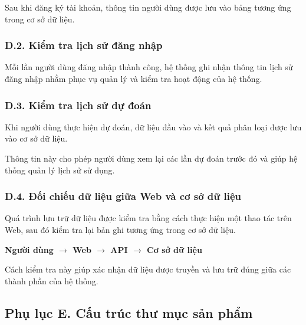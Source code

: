 \documentclass[14pt]{extarticle}
\begin{document}
	\noindent
	Sau khi đăng ký tài khoản, thông tin người dùng được lưu vào bảng
	tương ứng trong cơ sở dữ liệu.
	
	
	\subsubsection*{D.2. Kiểm tra lịch sử đăng nhập}
	
	\noindent
	Mỗi lần người dùng đăng nhập thành công, hệ thống ghi nhận thông tin
	lịch sử đăng nhập nhằm phục vụ quản lý và kiểm tra hoạt động của hệ thống.
	
	
	
	\subsubsection*{D.3. Kiểm tra lịch sử dự đoán}
	
	\noindent
	Khi người dùng thực hiện dự đoán, dữ liệu đầu vào và kết quả phân loại
	được lưu vào cơ sở dữ liệu.
	
	\noindent
	Thông tin này cho phép người dùng xem lại các lần dự đoán trước đó và
	giúp hệ thống quản lý lịch sử sử dụng.
	
	\subsubsection*{D.4. Đối chiếu dữ liệu giữa Web và cơ sở dữ liệu}
	
	\noindent
	Quá trình lưu trữ dữ liệu được kiểm tra bằng cách thực hiện một thao tác
	trên Web, sau đó kiểm tra lại bản ghi tương ứng trong cơ sở dữ liệu.
	
	\begin{center}
		\textbf{
			Người dùng
			$\rightarrow$
			Web
			$\rightarrow$
			API
			$\rightarrow$
			Cơ sở dữ liệu
		}
	\end{center}
	
	\noindent
	Cách kiểm tra này giúp xác nhận dữ liệu được truyền và lưu trữ đúng
	giữa các thành phần của hệ thống.
	
	
	
	
	\subsection*{Phụ lục E. Cấu trúc thư mục sản phẩm}
	
\end{document}
